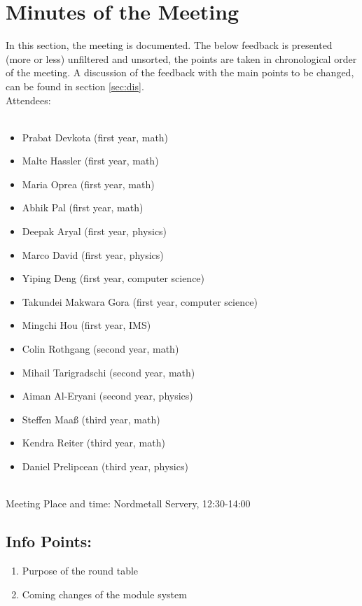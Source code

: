 
\section{Minutes of the Meeting}
\label{sec-1}
In this section, the meeting is documented. The below feedback is presented (more or less) unfiltered and unsorted, the points are taken in chronological order of the meeting. 
A discussion of the feedback with the main points to be changed, can be found in section \ref{sec:dis}. \\

\noindent Attendees: \\\\
\begin{minipage}{0.4\textwidth}
	\begin{itemize}
		\item Prabat Devkota (first year, math)
		\item Malte Hassler (first year, math)
		\item Maria Oprea (first year, math)
		\item Abhik Pal (first year, math)
		\item Deepak Aryal (first year, physics)
		\item Marco David (first year, physics)
		\item Yiping Deng (first year, computer science)
		\item Takundei Makwara Gora (first year, computer science)
		\end{itemize}
\end{minipage}
\begin{minipage}{0.4\textwidth}
	\begin{itemize}
		\item Mingchi Hou (first year, IMS)
		\item Colin Rothgang (second year, math)
		\item Mihail Tarigradschi (second year, math)
		\item Aiman Al-Eryani (second year, physics)
		\item Steffen Maaß (third year, math)
		\item Kendra Reiter (third year, math)
		\item Daniel Prelipcean (third year, physics)
	\end{itemize}
\end{minipage}\\

\noindent Meeting Place and time: Nordmetall Servery, 12:30-14:00
\subsection{Info Points:}
\label{sec-1-1}
\begin{enumerate}
\item Purpose of the round table
\item Coming changes of the module system
\end{enumerate}
